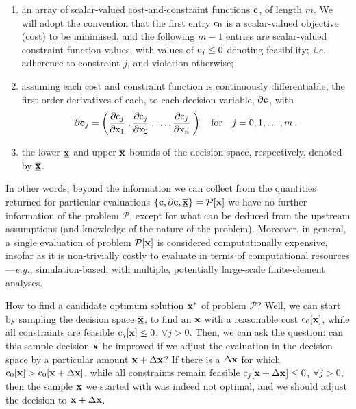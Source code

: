\documentclass[11pt]{article}
\begin{document}
\begin{enumerate}[label=(\roman*)]
  \item an array of scalar-valued cost-and-constraint functions $\mathbf{c}$, of length $m$. We will adopt the convention that the first entry $\textrm{c}_0$ is a scalar-valued objective (cost) to be minimised, and the following $m-1$ entries are scalar-valued constraint function values, with values of $\textrm{c}_j \leq 0$ denoting feasibility; \emph{i.e.} adherence to constraint $j$, and violation otherwise;
  \item assuming each cost and constraint function is continuously differentiable, the first order derivatives of each, to each decision variable, $\mathbf{\partial c}$, with
\begin{equation}
\mathbf{\partial c }_j = \left( \frac{\partial \textrm{c}_j}{\partial \textrm{x}_1 } \:,  \frac{\partial \textrm{c}_j}{\partial \textrm{x}_2} \: , \ldots,  \frac{\partial \textrm{c}_j}{\partial \textrm{x}_n} \: \right) \quad \text{for} \quad j = 0,1, \ldots, m \:.
\end{equation}
  \item the  lower $\underline{\mathbf{x}}$ and upper $\overline{\mathbf{x}}$ bounds of the decision space, respectively, denoted by $\underline{\overline{\mathbf{x}}}$.
\end{enumerate}

In other words, beyond the information we can collect from the quantities returned for particular evaluations $\left\{\mathbf{c}, \partial \mathbf{c}, \underline{\overline{\mathbf{x}}}\right\}=\mathcal{P}[\mathbf{x}]$ we have no further information of the problem $\mathcal{P}$, except for what can be deduced from the upstream assumptions (and knowledge of the nature of the problem). Moreover, in general, a single evaluation of problem $\mathcal{P}[\mathbf{x}]$ is considered computationally expensive, insofar as it is non-trivially costly to evaluate in terms of computational resources---\emph{e.g.}, simulation-based, with multiple, potentially large-scale finite-element analyses.

How to find a candidate optimum solution $\mathbf{x}^\ast$ of problem $\mathcal{P}$?  Well, we can start by sampling the decision space $\underline{\overline{\mathbf{x}}}$, to find an $\mathbf{x}$ with a reasonable cost $\textrm{c}_0 [\mathbf{x}]$, while all constraints are feasible $\textrm{c}_j [\mathbf{x}] \leq 0$, $\forall j > 0$. Then, we can ask the question: can this sample decision $\mathbf{x}$ be improved if we adjust the evaluation in the decision space by a particular amount $\mathbf{x} + \Delta \mathbf{x}$? If there is a $\Delta \mathbf{x}$ for which $\textrm{c}_0 [\mathbf{x}] > \textrm{c}_0 [\mathbf{x} + \Delta\mathbf{x}]$, while all constraints remain feasible $\textrm{c}_j [\mathbf{x} + \Delta \mathbf{x}] \leq 0$, $\forall j > 0$, then the sample $\mathbf{x}$ we started with was indeed not optimal, and we should adjust the decision to $\mathbf{x} + \Delta \mathbf{x}$.
\end{document}
